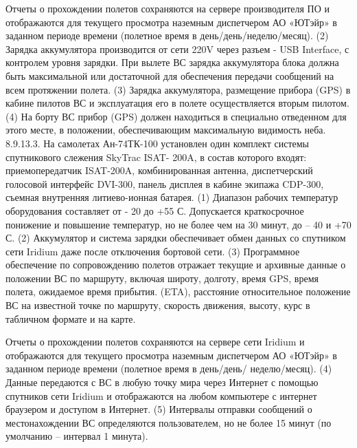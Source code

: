 Отчеты о прохождении полетов сохраняются на сервере производителя ПО и отображаются для текущего
просмотра наземным диспетчером АО «ЮТэйр» в заданном периоде времени (полетное время в день/день/неделю/месяц).
(2) Зарядка аккумулятора производится от сети 220V через разъем - USB Interface, с контролем уровня
зарядки. При вылете ВС зарядка аккумулятора блока должна быть максимальной или достаточной для обеспечения передачи сообщений на всем протяжении полета.
(3) Зарядка аккумулятора, размещение прибора (GPS) в кабине пилотов ВС и эксплуатация его в полете
осуществляется вторым пилотом.
(4) На борту ВС прибор (GPS) должен находиться в специально отведенном для этого месте, в положении, обеспечивающим максимальную видимость неба.
8.9.13.3. На самолетах Ан-74ТК-100 установлен один комплект системы спутникового слежения SkyTrac ISAT- 200A, в состав которого входят: приемопередатчик ISAT-200A, комбинированная антенна, диспетчерский голосовой интерфейс DVI-300, панель дисплея в кабине экипажа CDP-300, съемная внутренняя литиево-ионная батарея.
(1) Диапазон рабочих температур оборудования составляет от - 20 до +55 С. Допускается краткосрочное
понижение и повышение температур, но не более чем на 30 минут, до – 40 и +70 С.
(2) Аккумулятор и система зарядки обеспечивает обмен данных со спутником сети Iridium даже после
отключения бортовой сети.
(3) Программное обеспечение по сопровождению полетов отражает текущие и архивные данные о
положении ВС по маршруту, включая широту, долготу, время GPS, время полета, ожидаемое время прибытия.
(ETA), расстояние относительное положение ВС на известной точке по маршруту, скорость движения, высоту, курс в табличном формате и на карте. 
 
Отчеты о прохождении полетов сохраняются на сервере сети Iridium и отображаются для текущего
просмотра наземным диспетчером АО «ЮТэйр» в заданном периоде времени (полетное время в день/день/
неделю/месяц).
(4) Данные передаются с ВС в любую точку мира через Интернет с помощью спутников сети Iridium и
отображаются на любом компьютере с интернет браузером и доступом в Интернет.
(5) Интервалы отправки сообщений о местонахождении ВС определяются пользователем, но не более 15
минут (по умолчанию – интервал 1 минута).
